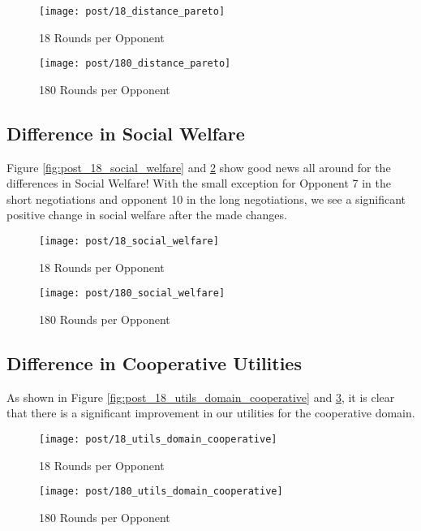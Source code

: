 \begin{figure}[H]
	\texttt{[image: post/18\_distance\_pareto]}
	\caption{18 Rounds per Opponent}
	\label{fig:post_18_distance_pareto}
	\endminipage\hfill
	\texttt{[image: post/180\_distance\_pareto]}
	\caption{180 Rounds per Opponent}
	\label{fig:post_180_distance_pareto}
	\endminipage\hfill
\end{figure}

\subsection{Difference in Social Welfare}

Figure \ref{fig:post_18_social_welfare} and \ref{fig:post_180_social_welfare} show good news all around for the differences in Social Welfare! With the small exception for Opponent 7 in the short negotiations and opponent 10 in the long negotiations, we see a significant positive change in social welfare after the made changes.

\begin{figure}[H]
	\texttt{[image: post/18\_social\_welfare]}
	\caption{18 Rounds per Opponent}
	\label{fig:post_18_social_welfare}
	\endminipage\hfill
	\texttt{[image: post/180\_social\_welfare]}
	\caption{180 Rounds per Opponent}
	\label{fig:post_180_social_welfare}
	\endminipage\hfill
\end{figure}

\subsection{Difference in Cooperative Utilities}

As shown in Figure \ref{fig:post_18_utils_domain_cooperative} and \ref{fig:post_180_utils_domain_cooperative}, it is clear that there is a significant improvement in our utilities for the cooperative domain.

\begin{figure}[H]
	\texttt{[image: post/18\_utils\_domain\_cooperative]}
	\caption{18 Rounds per Opponent}
	\label{fig:post_18_utils_domain_cooperative}
	\endminipage\hfill
	\texttt{[image: post/180\_utils\_domain\_cooperative]}
	\caption{180 Rounds per Opponent}
	\label{fig:post_180_utils_domain_cooperative}
	\endminipage\hfill
\end{figure}

